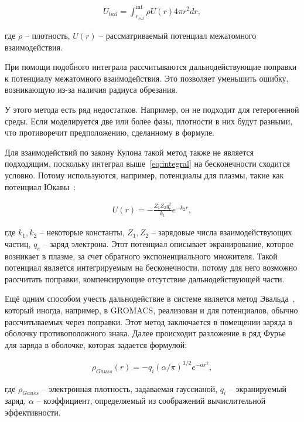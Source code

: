 \begin{align}
	\label{eq:integral}
	U_{tail} = \int_{r_{cut}}^{\inf} \rho U(r) 4 \pi r^2 dr,
\end{align}

где $\rho$ \--- плотность, $U(r)$ \--- рассматриваемый потенциал межатомного взаимодействия.

При помощи подобного интеграла рассчитываются дальнодействующие поправки к потенциалу межатомного взаимодействия. Это позволяет уменьшить ошибку, возникающую из-за наличия радиуса обрезания. 

У этого метода есть ряд недостатков. Например, он не подходит для гетерогенной среды. Если моделируется две или более фазы, плотности в них будут разными, что противоречит предположению, сделанному в формуле.

Для взаимодействий по закону Кулона такой метод также не является подходящим, поскольку интеграл выше~\cref{eq:integral} на бесконечности сходится условно. Потому используются, например, потенциалы для плазмы, такие как потенциал Юкавы~\cite{yukawa_interaction_1955}:

\begin{align}
    U(r) = - \frac{Z_1 Z_2 q_e^2}{k_1} e^{-k_2r},
\end{align}

где $k_1, k_2$ \--- некоторые константы, $Z_1, Z_2$ \--- зарядовые числа взаимодействующих частиц, $q_e$ \--- заряд электрона. Этот потенциал описывает экранирование, которое возникает в плазме, за счет обратного экспоненциального множителя. Такой потенциал является интегрируемым на бесконечности, потому для него возможно рассчитать поправки, компенсирующие отсутствие дальнодействующей части.

Ещё одним способом учесть дальнодействие в системе является метод Эвальда~\cite{kolafa_cutoff_1992}, который иногда, например, в GROMACS, реализован и для потенциалов, обычно рассчитываемых через поправки. Этот метод заключается в помещении заряда в оболочку противоположного знака. Далее происходит разложение в ряд Фурье для заряда в оболочке, которая задается формулой:

\begin{align}
    \rho_{Gauss}(r) = - q_i (\alpha / \pi)^{3/2} e^{-\alpha r^2},
\end{align}


где $\rho_{Gauss}$ \--- электронная плотность, задаваемая гауссианой, $q_i$ \--- экранируемый заряд, $\alpha$ \--- коэффициент, определяемый из соображений вычислительной эффективности.

